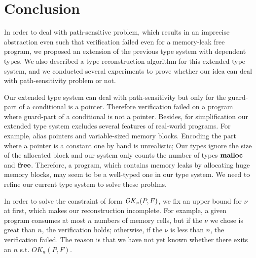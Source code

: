 \section{Conclusion}\label{sec:conclusion}
In order to deal with path-sensitive problem, which results in an
imprecise abstraction even such that verification failed even for a
memory-leak free program, we proposed an extension of the previous
type system with dependent types.  We also described a type
reconstruction algorithm for this extended type system, and we
conducted several experiments to prove whether our idea can deal with
path-sensitivity problem or not.

Our extended type system can deal with path-sensitivity but only for
the guard-part of a conditional is a pointer. Therefore verification
failed on a program where guard-part of a conditional is not a
pointer. Besides, for simplification our extended type system excludes
several features of real-world programs. For example, alias pointers
and variable-sized memory blocks. Encoding the part where a pointer is
a constant one by hand is unrealistic; Our types ignore the size of
the allocated block and our system only counts the number of types
\(\mathbf{malloc}\) and \(\mathbf{free}\). Therefore, a program, which contains memory
leaks by allocating huge memory blocks, may seem to be a well-typed
one in our type system.  We need to refine our current type system to
solve these problms.

In order to solve the constraint of form \(\mathit{OK}_\nu(P, F)\), we fix an
upper bound for \(\nu\) at first, which makes our reconstruction
incomplete. For example, a given program consumes at most \(n\)
numbers of memory cells, but if the \(\nu\) we chose is great than
\(n\), the verification holds; otherwise, if the \(\nu\) is less than
\(n\), the verification failed. The reason is that we have not yet
known whether there exits an \(n\) s.t. \(OK_n(P, F)\).
